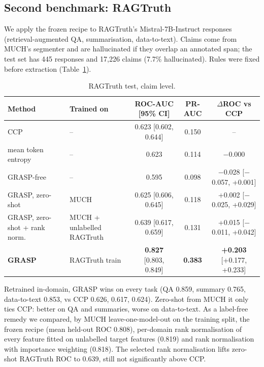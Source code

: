 \documentclass[11pt]{article}
\begin{document}
\subsection{Second benchmark: RAGTruth}
We apply the frozen recipe to RAGTruth's Mistral-7B-Instruct responses (retrieval-augmented QA,
summarisation, data-to-text). Claims come from MUCH's segmenter and are hallucinated if they overlap
an annotated span; the test set has 445 responses and 17,226 claims (7.7\% hallucinated). Rules were
fixed before extraction (Table~\ref{tab:rag}).
\begin{table}[t]
\centering\small
\begin{tabular}{llccc}
\toprule
Method & Trained on & ROC-AUC [95\% CI] & PR-AUC & $\Delta$ROC vs CCP \\
\midrule
CCP & -- & 0.623 [0.602, 0.644] & 0.150 & -- \\
mean token entropy & -- & 0.623 & 0.114 & $-$0.000 \\
GRASP-free & -- & 0.595 & 0.098 & $-$0.028 [$-$0.057, +0.001] \\
GRASP, zero-shot & MUCH & 0.625 [0.606, 0.645] & 0.118 & +0.002 [$-$0.025, +0.029] \\
GRASP, zero-shot + rank norm. & MUCH + unlabelled RAGTruth & 0.639 [0.617, 0.659] & 0.131 & +0.015 [$-$0.011, +0.042] \\
\textbf{GRASP} & RAGTruth train & \textbf{0.827} [0.803, 0.849] & \textbf{0.383} & \textbf{+0.203} [+0.177, +0.233] \\
\bottomrule
\end{tabular}
\caption{RAGTruth test, claim level.}
\label{tab:rag}
\end{table}
Retrained in-domain, GRASP wins on every task (QA 0.859, summary 0.765, data-to-text 0.853, vs
CCP 0.626, 0.617, 0.624). Zero-shot from MUCH it only ties CCP: better on QA and summaries, worse
on data-to-text. As a label-free remedy we compared, by MUCH leave-one-model-out on the training
split, the frozen recipe (mean held-out ROC 0.808), per-domain rank normalisation of every feature
fitted on unlabelled target features (0.819) and rank normalisation with importance weighting
(0.818). The selected rank normalisation lifts zero-shot RAGTruth ROC to 0.639, still not
significantly above CCP.
\end{document}
